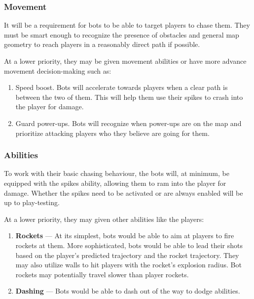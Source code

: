 \documentclass{article}
\theoremstyle{definition}
\begin{document}
\subsubsection{Movement}

It will be a requirement for bots to be able to target players to chase them.
They must be smart enough to recognize the presence of obstacles and general
map geometry to reach players in a reasonably direct path if possible.

At a lower priority, they may be given movement abilities or have more advance
movement decision-making such as:
\begin{enumerate}
  \item Speed boost. Bots will accelerate towards players when a clear path is
    between the two of them. This will help them use their spikes to crash into
    the player for damage.
  \item Guard power-ups. Bots will recognize when power-ups are on the map and
    prioritize attacking players who they believe are going for them.
\end{enumerate}

\subsubsection{Abilities}

To work with their basic chasing behaviour, the bots will, at minimum, be
equipped with the spikes ability, allowing them to ram into the player for
damage. Whether the spikes need to be activated or are always enabled will be
up to play-testing.

At a lower priority, they may given other abilities like the players:
\begin{enumerate}
  \item \textbf{Rockets} --- At its simplest, bots would be able to aim at
    players to fire rockets at them. More sophisticated, bots would be able to
    lead their shots based on the player's predicted trajectory and the rocket
    trajectory. They may also utilize walls to hit players with the rocket's
    explosion radius. Bot rockets may potentially travel slower than player
    rockets.
  \item \textbf{Dashing} --- Bots would be able to dash out of the way to dodge
    abilities.
\end{enumerate}
\end{document}
